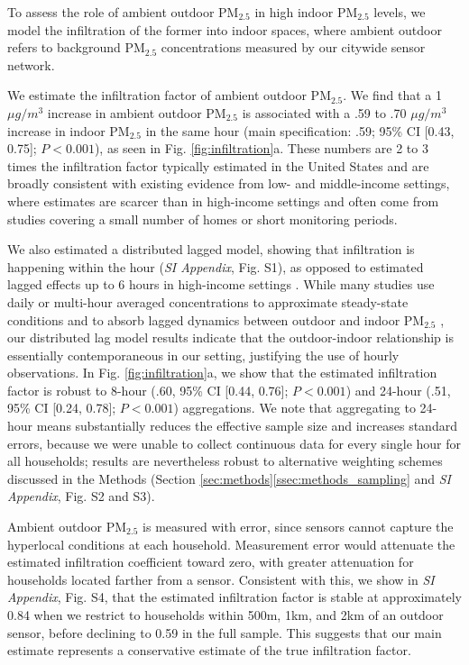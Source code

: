 \documentclass[9pt,twocolumn,twoside]{pnas-new}
\begin{document}
To assess the role of ambient outdoor PM$_{2.5}$ in high indoor PM$_{2.5}$ levels, we model the infiltration of the former into indoor spaces, where ambient outdoor refers to background PM$_{2.5}$ concentrations measured by our citywide sensor network.

We estimate the infiltration factor of ambient outdoor PM$_{2.5}$.
We find that a 1 $\mu g /m^{3}$ increase in ambient outdoor PM$_{2.5}$ is associated with a .59 to .70 $\mu g/m^3$ increase in indoor PM$_{2.5}$ in the same hour (main specification: .59; 95\% CI [0.43, 0.75]; $P < 0.001$), as seen in Fig. \ref{fig:infiltration}a. 
These numbers are 2 to 3 times the infiltration factor typically estimated in the United States \citep{burke_exposures_2022, lunderberg_assessing_2023} and are broadly consistent with existing evidence from low- and middle-income settings, where estimates are scarcer than in high-income settings and often come from studies covering a small number of homes or short monitoring periods.

We also estimated a distributed lagged model, showing that infiltration is happening within the hour (\textit{SI Appendix}, Fig. S1), as opposed to estimated lagged effects up to 6 hours in high-income settings \citep{burke_exposures_2022, lunderberg_assessing_2023}. While many studies use daily or multi-hour averaged concentrations to approximate steady-state conditions and to absorb lagged dynamics between outdoor and indoor PM$_{2.5}$ \citep{chen_review_2011}, our distributed lag model results indicate that the outdoor-indoor relationship is essentially contemporaneous in our setting, justifying the use of hourly observations. In Fig. \ref{fig:infiltration}a, we show that the estimated infiltration factor is robust to 8-hour (.60, 95\% CI [0.44, 0.76]; $P < 0.001$) and 24-hour (.51, 95\% CI [0.24, 0.78]; $P < 0.001$) aggregations. We note that aggregating to 24-hour means substantially reduces the effective sample size and increases standard errors, because we were unable to collect continuous data for every single hour for all households; results are nevertheless robust to alternative weighting schemes discussed in the Methods (Section \ref{sec:methods}\ref{ssec:methods_sampling} and \textit{SI Appendix}, Fig. S2 and S3). 

Ambient outdoor PM$_{2.5}$ is measured with error, since sensors cannot capture the hyperlocal conditions at each household. Measurement error would attenuate the estimated infiltration coefficient toward zero, with greater attenuation for households located farther from a sensor. Consistent with this, we show in \textit{SI Appendix}, Fig. S4, that the estimated infiltration factor is stable at approximately 0.84 when we restrict to households within 500m, 1km, and 2km of an outdoor sensor, before declining to 0.59 in the full sample. This suggests that our main estimate represents a conservative estimate of the true infiltration factor.
\end{document}
